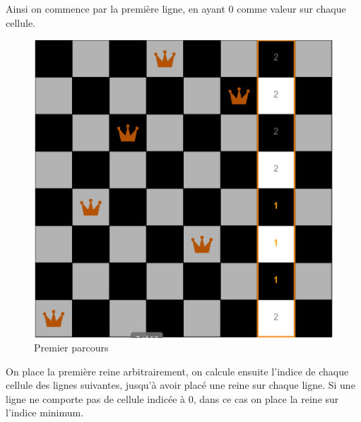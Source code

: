 \documentclass{article}
\begin{document}
Ainsi on commence par la première ligne, en ayant 0 comme valeur sur chaque cellule. 

\clearpage
\begin{figure}[!h]
	\caption{\label{local2} Premier parcours}
	\begin{center}
	\includegraphics[scale=0.3]{./picture/local2.png}
	\end{center}
\end{figure}

On place la première reine arbitrairement, on calcule ensuite l'indice de chaque cellule des lignes suivantes, jusqu'à avoir placé une reine sur chaque ligne. Si une ligne ne comporte pas de cellule indicée à 0, dans ce cas on place la reine sur l'indice minimum. 
\end{document}
